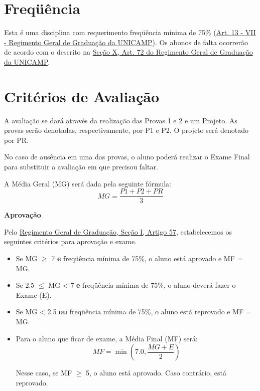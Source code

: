 \documentclass[paper=letter, fontsize=12pt]{scrartcl} %
\begin{document}
\section{Freqüência}

Esta é uma disciplina com requerimento freqüência mínima de 75\% (\href{https://www.dac.unicamp.br/portal/graduacao/regimento-geral}{Art. 13 - VII - Regimento Geral de Graduação da UNICAMP}). Os abonos de falta ocorrerão de acordo com o descrito na \href{https://www.dac.unicamp.br/portal/graduacao/regimento-geral}{Seção X, Art. 72 do Regimento Geral de Graduação da UNICAMP}.

\section{Critérios de Avaliação}

A avaliação se dará através da realização das Provas 1 e 2 e um Projeto. As provas serão denotadas, respectivamente, por P1 e P2. O projeto será denotado por PR.


\vspace{10pt}

No caso de ausência em uma das provas, o aluno poderá realizar o Exame Final para substituir a avaliação em que precisou faltar.

\vspace{10pt}

A Média Geral (MG) será dada pela seguinte fórmula:
\[MG = \frac{P1 + P2 + PR}{3}\]

\textbf{Aprovação}

Pelo \href{https://www.dac.unicamp.br/portal/graduacao/regimento-geral}{{\color{blue} Regimento Geral de Graduação, Seção I, Artigo 57}}, estabelecemos os seguintes critérios para aprovação e exame.

\begin{itemize}
\item Se MG $\geq$ 7 \textbf{e} freqüência mínima de 75\%, o aluno está aprovado e MF = MG.

\item Se 2.5 $\leq$ MG < 7 \textbf{e} freqüência mínima de 75\%, o aluno deverá fazer o Exame (E).

\item Se MG < 2.5 \textbf{ou} freqüência mínima de 75\%, o aluno está reprovado e MF = MG.

\item Para o aluno que ficar de exame, a Média Final (MF) será:
$$MF = \min\left(7.0, \frac{MG + E}{2}\right)$$

Nesse caso, se MF $\geq$ 5, o aluno está aprovado. Caso contrário, está reprovado.


\end{itemize}
\end{document}
